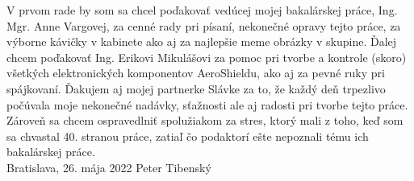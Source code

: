 \null
\vfill
\noindent

V prvom rade by som sa chcel poďakovať vedúcej mojej bakalárskej práce, Ing. Mgr. Anne Vargovej, za cenné rady pri písaní, nekonečné opravy tejto práce, za výborne kávičky v kabinete ako aj za najlepšie meme obrázky v skupine. Ďalej chcem poďakovať Ing. Erikovi Mikulášovi za pomoc pri tvorbe a kontrole (skoro) všetkých elektronických komponentov AeroShieldu, ako aj za pevné ruky pri spájkovaní. Ďakujem aj mojej partnerke Slávke za to, že každý deň trpezlivo počúvala moje nekonečné nadávky, sťažnosti ale aj radosti pri tvorbe tejto práce. Zároveň sa chcem ospravedlniť spolužiakom za stres, ktorý mali z toho, keď som sa chvastal 40. stranou práce, zatiaľ čo podaktorí ešte nepoznali tému ich bakalárskej práce.\\

\noindent Bratislava, 26. mája 2022 \hfill  Peter Tibenský
\cleardoublepage


	


